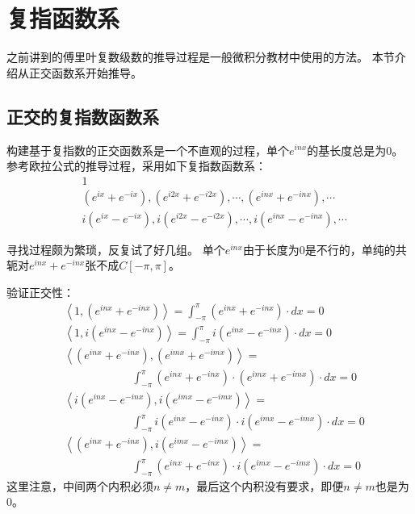 \section{复指函数系}

之前讲到的傅里叶复数级数的推导过程是一般微积分教材中使用的方法。
本节介绍从正交函数系开始推导。

\subsection{正交的复指数函数系}

构建基于复指数的正交函数系是一个不直观的过程，单个$e^{inx}$的基长度总是为0。
参考欧拉公式的推导过程，采用如下复指数函数系：
\begin{align*}
&1 \\
&\left( e^{ix}+e^{-ix} \right) ,\left( e^{i2x}+e^{-i2x} \right) ,\cdots ,\left( e^{inx}+e^{-inx} \right) ,\cdots \\
&i\left( e^{ix}-e^{-ix} \right) ,i\left( e^{i2x}-e^{-i2x} \right) ,\cdots ,i\left( e^{inx}-e^{-inx} \right) ,\cdots
\end{align*}

\begin{tcolorbox}
寻找过程颇为繁琐，反复试了好几组。
单个$e^{inx}$由于长度为0是不行的，单纯的共轭对$e^{inx}+e^{-inx}$张不成$C\left[ -\pi ,\pi \right] $。
\end{tcolorbox}

验证正交性：
\begin{align*}
&\left< 1,\left( e^{inx}+e^{-inx} \right) \right> =\int_{-\pi}^{\pi}{\left( e^{inx}+e^{-inx} \right) \cdot dx}=0 \\
&\left< 1,i\left( e^{inx}-e^{-inx} \right) \right> =\int_{-\pi}^{\pi}{i\left( e^{inx}-e^{-inx} \right) \cdot dx}=0 \\
&\left< \left( e^{inx}+e^{-inx} \right) ,\left( e^{imx}+e^{-imx} \right) \right> = \\
& \qquad \qquad \qquad \int_{-\pi}^{\pi}{\left( e^{inx}+e^{-inx} \right) \cdot \left( e^{imx}+e^{-imx} \right) \cdot dx}=0 \\
&\left< i\left( e^{inx}-e^{-inx} \right) ,i\left( e^{imx}-e^{-imx} \right) \right> = \\
& \qquad \qquad \qquad \int_{-\pi}^{\pi}{i\left( e^{inx}-e^{-inx} \right) \cdot i\left( e^{imx}-e^{-imx} \right) \cdot dx}=0 \\
&\left< \left( e^{inx}+e^{-inx} \right) ,i\left( e^{imx}-e^{-imx} \right) \right> = \\
& \qquad \qquad \qquad \int_{-\pi}^{\pi}{\left( e^{inx}+e^{-inx} \right) \cdot i\left( e^{imx}-e^{-imx} \right) \cdot dx}=0
\end{align*}
这里注意，中间两个内积必须$n\ne m$，最后这个内积没有要求，即便$n\ne m$也是为0。


